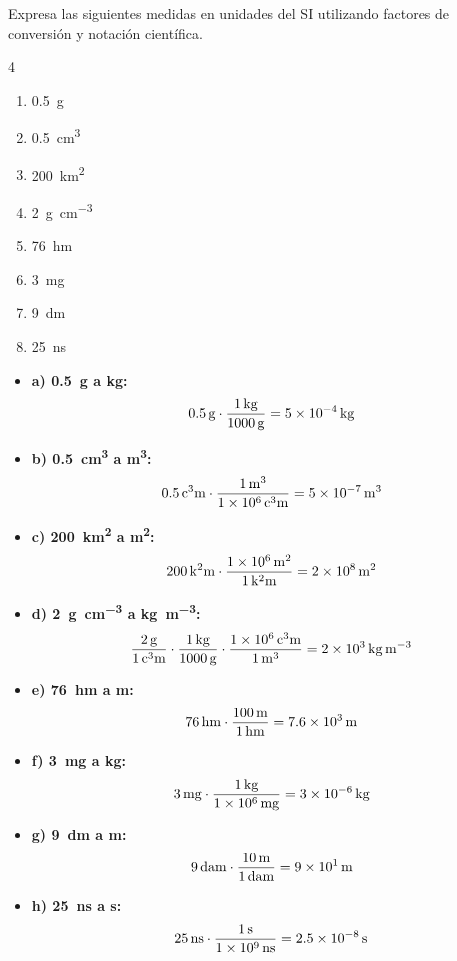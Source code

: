 \begin{exercise}
    Expresa las siguientes medidas en unidades del SI utilizando factores de conversión y notación científica.
    \begin{multicols}{4}
        \begin{enumerate}[label=\letraminuscula]
\item \qty{0.5}{\g}
\item \qty{0.5}{\cubic\centi\metre}
\item \qty{200}{\square\kilo\metre}
\item \qty{2}{\g\per\cubic\centi\metre}
\item \qty{76}{\hecto\m}
\item \qty{3}{\milli\g}
\item \qty{9}{\deca\m}
\item \qty{25}{\nano\s}
        \end{enumerate}
    \end{multicols}

    \begin{solu}
        \begin{itemize}
            \item \textbf{a) \qty{0.5}{\g} a \unit{\kg}:}
            \[ \qty{0.5}{\cancel{\g}} \cdot \frac{\qty{1}{\kg}}{\qty{1000}{\cancel{\g}}} = \qty{5e-4}{\kg} \]
            \item \textbf{b) \qty{0.5}{\cubic\centi\metre} a \unit{\cubic\metre}:}
            \[ \qty{0.5}{\cancel{\cubic\centi\metre}} \cdot \frac{\qty{1}{\cubic\metre}}{\qty{1e6}{\cancel{\cubic\centi\metre}}} = \qty{5e-7}{\cubic\metre} \]
            \item \textbf{c) \qty{200}{\square\kilo\metre} a \unit{\square\metre}:}
            \[ \qty{200}{\cancel{\square\kilo\metre}} \cdot \frac{\qty{1e6}{\square\metre}}{\qty{1}{\cancel{\square\kilo\metre}}} = \qty{2e8}{\square\metre} \]
            \item \textbf{d) \qty{2}{\g\per\cubic\centi\metre} a \unit{\kg\per\cubic\metre}:}
            \[ \frac{\qty{2}{\cancel{\g}}}{\qty{1}{\cancel{\cubic\centi\metre}}} \cdot \frac{\qty{1}{\kg}}{\qty{1000}{\cancel{\g}}} \cdot \frac{\qty{1e6}{\cancel{\cubic\centi\metre}}}{\qty{1}{\cubic\metre}} = \qty{2e3}{\kg\per\cubic\metre} \]
            \item \textbf{e) \qty{76}{\hecto\m} a \unit{\m}:}
            \[ \qty{76}{\cancel{\hecto\m}} \cdot \frac{\qty{100}{\m}}{\qty{1}{\cancel{\hecto\m}}} = \qty{7.6e3}{\m} \]
            \item \textbf{f) \qty{3}{\milli\g} a \unit{\kg}:}
            \[ \qty{3}{\cancel{\milli\g}} \cdot \frac{\qty{1}{\kg}}{\qty{1e6}{\cancel{\milli\g}}} = \qty{3e-6}{\kg} \]
            \item \textbf{g) \qty{9}{\deca\m} a \unit{\m}:}
            \[ \qty{9}{\cancel{\deca\m}} \cdot \frac{\qty{10}{\m}}{\qty{1}{\cancel{\deca\m}}} = \qty{9e1}{\m} \]
            \item \textbf{h) \qty{25}{\nano\s} a \unit{\s}:}
            \[ \qty{25}{\cancel{\nano\s}} \cdot \frac{\qty{1}{\s}}{\qty{1e9}{\cancel{\nano\s}}} = \qty{2.5e-8}{\s} \]
        \end{itemize}
    \end{solu}


\end{exercise}

